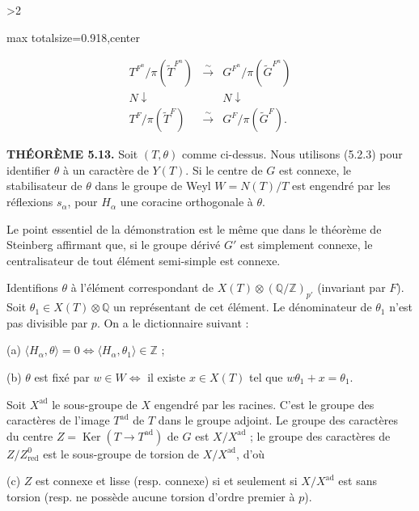 \documentclass[9pt,twoside]{extarticle}
\newcommand{\EditionPage}[3]{%
  \ifnum#1>2\clearpage\fi
  \pdfbookmark[1]{Printed page #2}{fr-folio-#2}%
  \hypertarget{fr-physical-#1}{}%
  \noindent\begin{adjustbox}{max totalsize={\textwidth}{0.918\textheight},center}
  \begin{minipage}[t]{\textwidth}
  \fontsize{9.4}{11.1}\selectfont\justifying
  #3
  \end{minipage}
  \end{adjustbox}%
}
\begin{document}
\EditionPage{30}{131}{%
\[
\begin{array}{ccc}
T^{F^n}/\pi(\widetilde T^{F^n})&\xrightarrow{\sim}&G^{F^n}/\pi(\widetilde G^{F^n})\\
{\scriptstyle N}\downarrow&&{\scriptstyle N}\downarrow\\
T^F/\pi(\widetilde T^F)&\xrightarrow{\sim}&G^F/\pi(\widetilde G^F).
\end{array}
\]

\noindent\textbf{THÉORÈME 5.13.} Soit \((T,\theta)\) comme ci-dessus. Nous utilisons (5.2.3) pour identifier \(\theta\) à un caractère de \(Y(T)\). Si le centre de \(G\) est connexe, le stabilisateur de \(\theta\) dans le groupe de Weyl \(W=N(T)/T\) est engendré par les réflexions \(s_\alpha\), pour \(H_\alpha\) une coracine orthogonale à \(\theta\).\par

Le point essentiel de la démonstration est le même que dans le théorème de Steinberg affirmant que, si le groupe dérivé \(G'\) est simplement connexe, le centralisateur de tout élément semi-simple est connexe.\par

Identifions \(\theta\) à l'élément correspondant de \(X(T)\otimes(\mathbb Q/\mathbb Z)_{p'}\) (invariant par \(F\)). Soit \(\theta_1\in X(T)\otimes\mathbb Q\) un représentant de cet élément. Le dénominateur de \(\theta_1\) n'est pas divisible par \(p\). On a le dictionnaire suivant :\par

(a) \(\langle H_\alpha,\theta\rangle=0\Longleftrightarrow\langle H_\alpha,\theta_1\rangle\in\mathbb Z\) ;\par

(b) \(\theta\) est fixé par \(w\in W\Longleftrightarrow\) il existe \(x\in X(T)\) tel que \(w\theta_1+x=\theta_1\).\par

Soit \(X^{\mathrm{ad}}\) le sous-groupe de \(X\) engendré par les racines. C'est le groupe des caractères de l'image \(T^{\mathrm{ad}}\) de \(T\) dans le groupe adjoint. Le groupe des caractères du centre \(Z=\operatorname{Ker}(T\to T^{\mathrm{ad}})\) de \(G\) est \(X/X^{\mathrm{ad}}\) ; le groupe des caractères de \(Z/Z_{\mathrm{red}}^0\) est le sous-groupe de torsion de \(X/X^{\mathrm{ad}}\), d'où\par

(c) \(Z\) est connexe et lisse (resp. connexe) si et seulement si \(X/X^{\mathrm{ad}}\) est sans torsion (resp. ne possède aucune torsion d'ordre premier à \(p\)).\par

}
\end{document}
